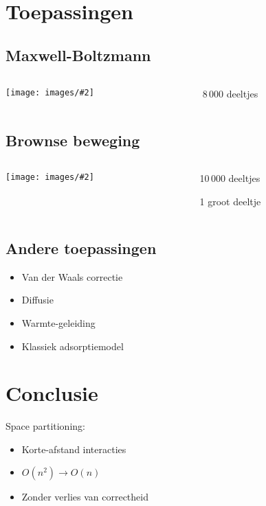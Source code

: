 \documentclass{beamer}
\newcommand{\includeGraph}[2]{
	\begin{center}
	\scalebox{#1}{
		
	}
	\end{center}
}
\newcommand{\includePicture}[2]{
	\begin{center}
	\texttt{[image: images/\#2]}
	\end{center}
}
\begin{document}
\section{Toepassingen}
\subsection{Maxwell-Boltzmann}
\begin{frame}
\begin{columns}
\begin{column}{0.7\textwidth}
\includePicture{1.00}{maxwellRender.png}
\end{column}
\begin{column}{0.3\textwidth}
8\,000 deeltjes
\end{column}
\end{columns}
\end{frame}

\begin{frame}
\includeGraph{0.8}{relax}
\end{frame}

\begin{frame}
\includeGraph{0.8}{maxwell}
\end{frame}

\subsection{Brownse beweging}
\begin{frame}
\begin{columns}
\begin{column}{0.7\textwidth}
\includePicture{1.00}{brownRender.png}
\end{column}
\begin{column}{0.3\textwidth}
10\,000 deeltjes

1 groot deeltje
\end{column}
\end{columns}
\end{frame}

\begin{frame}
\includeGraph{0.6}{brown}
\end{frame}

\subsection{Andere toepassingen}
\begin{frame}
\begin{itemize}
\item Van der Waals correctie
\item Diffusie
\item Warmte-geleiding
\item Klassiek adsorptiemodel
\end{itemize}
\end{frame}

\section{Conclusie}
\begin{frame}
Space partitioning:
\begin{itemize}
\item Korte-afstand interacties
\item $O(n^2) \rightarrow O(n)$
\item Zonder verlies van correctheid
\end{itemize}
\end{frame}
\end{document}
